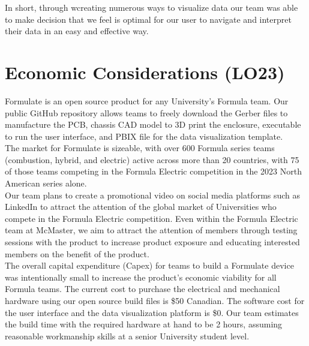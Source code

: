 \documentclass[12pt]{article}
\begin{document}
In short, through wcreating numerous ways to visualize data our team was able to make decision that we feel is optimal for our user to navigate and interpret their data in an easy and effective way.


\section{Economic Considerations (LO23)}


Formulate is an open source product for any University's Formula team. Our public GitHub repository allows teams to freely download the Gerber files to manufacture the PCB, chassis CAD model to 3D print the enclosure, executable to run the user interface, and PBIX file for the data visualization template. \\

The market for Formulate is sizeable, with over 600 Formula series teams (combustion, hybrid, and electric) active across more than 20 countries, with 75 of those teams competing in the Formula Electric competition in the 2023 North American series alone. \\

Our team plans to create a promotional video on social media platforms such as LinkedIn to attract the attention of the global market of Universities who compete in the Formula Electric competition. Even within the Formula Electric team at McMaster, we aim to attract the attention of members through testing sessions with the product to increase product exposure and educating interested members on the benefit of the product. \\

The overall capital expenditure (Capex) for teams to build a Formulate device was intentionally small to increase the product's economic viability for all Formula teams. The current cost to purchase the electrical and mechanical hardware using our open source build files is \$50 Canadian. The software cost for the user interface and the data visualization platform is \$0. Our team estimates the build time with the required hardware at hand to be 2 hours, assuming reasonable workmanship skills at a senior University student level. \\
\end{document}
